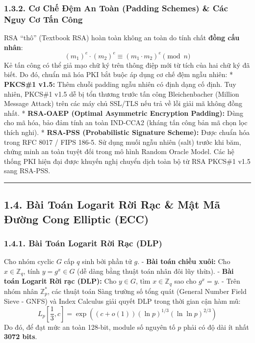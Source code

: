 \documentclass[
]{article}
\begin{document}
\subsubsection{1.3.2. Cơ Chế Đệm An Toàn (Padding Schemes) \& Các Nguy
Cơ Tấn
Công}\label{cux1a1-chux1ebf-ux111ux1ec7m-an-touxe0n-padding-schemes-cuxe1c-nguy-cux1a1-tux1ea5n-cuxf4ng}

RSA ``thô'' (Textbook RSA) hoàn toàn không an toàn do tính chất
\textbf{đồng cấu nhân}:
\[(m_1)^e \cdot (m_2)^e \equiv (m_1 \cdot m_2)^e \pmod n\] Kẻ tấn công
có thể giả mạo chữ ký trên thông điệp mới từ tích của hai chữ ký đã
biết. Do đó, chuẩn mã hóa PKI bắt buộc áp dụng cơ chế đệm ngẫu nhiên: *
\textbf{PKCS\#1 v1.5:} Thêm chuỗi padding ngẫu nhiên có định dạng cố
định. Tuy nhiên, PKCS\#1 v1.5 dễ bị tổn thương trước tấn công
Bleichenbacher (Million Message Attack) trên các máy chủ SSL/TLS nếu trả
về lỗi giải mã không đồng nhất. * \textbf{RSA-OAEP (Optimal Asymmetric
Encryption Padding):} Dùng cho mã hóa, bảo đảm tính an toàn IND-CCA2
(kháng tấn công bản mã chọn lọc thích nghi). * \textbf{RSA-PSS
(Probabilistic Signature Scheme):} Được chuẩn hóa trong RFC 8017 / FIPS
186-5. Sử dụng muối ngẫu nhiên (salt) trước khi băm, chứng minh an toàn
tuyệt đối trong mô hình Random Oracle Model. Các hệ thống PKI hiện đại
được khuyến nghị chuyển dịch toàn bộ từ RSA PKCS\#1 v1.5 sang RSA-PSS.

\begin{center}\rule{0.5\linewidth}{0.5pt}\end{center}

\subsection{1.4. Bài Toán Logarit Rời Rạc \& Mật Mã Đường Cong Elliptic
(ECC)}\label{buxe0i-touxe1n-logarit-rux1eddi-rux1ea1c-mux1eadt-muxe3-ux111ux1b0ux1eddng-cong-elliptic-ecc}

\subsubsection{1.4.1. Bài Toán Logarit Rời Rạc
(DLP)}\label{buxe0i-touxe1n-logarit-rux1eddi-rux1ea1c-dlp}

Cho nhóm cyclic \(G\) cấp \(q\) sinh bởi phần tử \(g\). - \textbf{Bài
toán chiều xuôi:} Cho \(x \in \mathbb{Z}_q\), tính \(y = g^x \in G\) (dễ
dàng bằng thuật toán nhân đôi lũy thừa). - \textbf{Bài toán Logarit Rời
rạc (DLP):} Cho \(y \in G\), tìm \(x \in \mathbb{Z}_q\) sao cho
\(g^x = y\). - Trên nhóm nhân \(\mathbb{Z}_p^*\), các thuật toán Sàng
trường số tổng quát (General Number Field Sieve - GNFS) và Index
Calculus giải quyết DLP trong thời gian cận hàm mũ:
\[L_p\left[\frac{1}{3}, c\right] = \exp\left((c + o(1)) (\ln p)^{1/3} (\ln \ln p)^{2/3}\right)\]
Do đó, để đạt mức an toàn 128-bit, module số nguyên tố \(p\) phải có độ
dài ít nhất \textbf{3072 bits}.
\end{document}
